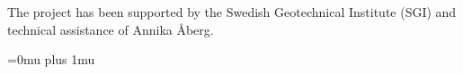 \documentclass[10pt,twoside,twocolumn,a4paper]{article}
\begin{document}
\begin{acknowledgements}
The project has been supported by the Swedish Geotechnical Institute (SGI) and technical assistance of Annika Åberg. 

\end{acknowledgements}

\Urlmuskip=0mu plus 1mu\relax

%
%


\end{document}
